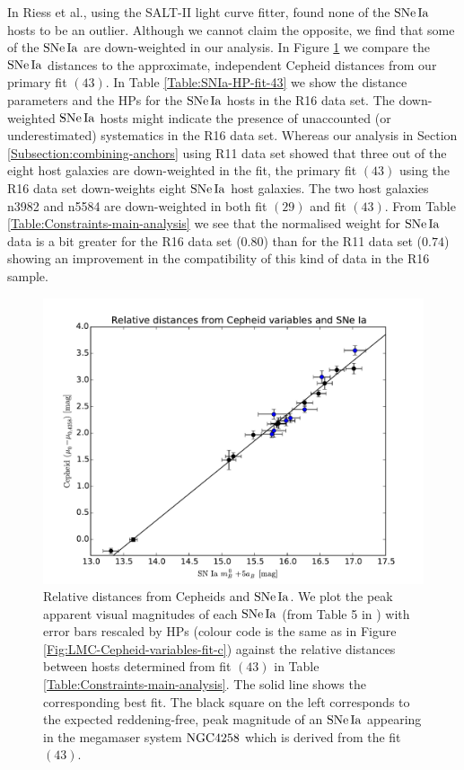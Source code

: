 In \cite{Riess:2016jrr} Riess et al., using the SALT-II light curve fitter, found none of the $\mathrm{SNe\,Ia}$ hosts to be an outlier. Although we cannot claim the opposite, we find that some of the $\mathrm{SNe\,Ia}$ are down-weighted in our analysis. In Figure \ref{Fig:comparison-distances-R16} we compare the $\mathrm{SNe\,Ia}$ distances to the approximate, independent Cepheid distances from our primary fit $(43)$. In Table \ref{Table:SNIa-HP-fit-43} we show the distance parameters and the HPs for the $\mathrm{SNe\,Ia}$ hosts in the R16 data set. The down-weighted $\mathrm{SNe\,Ia}$ hosts might indicate the presence of unaccounted (or underestimated) systematics in the R16 data set. Whereas our analysis in Section \ref{Subsection:combining-anchors} using R11 data set showed that three out of the eight host galaxies are down-weighted in the fit, the primary fit $(43)$ using the R16 data set down-weights eight $\mathrm{SNe\,Ia}$ host galaxies. The two host galaxies n3982 and n5584 are down-weighted in both fit $(29)$ and fit $(43)$. From Table \ref{Table:Constraints-main-analysis} we see that the normalised weight for $\mathrm{SNe\,Ia}$ data is a bit greater for the R16 data set ($0.80$) than for the R11 data set ($0.74$) showing an improvement in the compatibility of this kind of data in the R16 sample.

\begin{figure}[hbtp]
\centering
\includegraphics[width=\textwidth]{figures/chapter-h0/effective_HP_SNIa_R16.pdf}
\caption{Relative distances from Cepheids and $\mathrm{SNe\,Ia}$. We plot the peak apparent visual magnitudes of each $\mathrm{SNe\,Ia}$ (from Table 5 in \cite{Riess:2016jrr}) with error bars rescaled by HPs (colour code is the same as in Figure \ref{Fig:LMC-Cepheid-variables-fit-c}) against the relative distances between hosts determined from fit $(43)$ in Table \ref{Table:Constraints-main-analysis}. The solid line shows the corresponding best fit. The black square on the left corresponds to the expected reddening-free, peak magnitude of an $\mathrm{SNe\,Ia}$ appearing in the megamaser system $\mathrm{NGC4258}$ which is derived from the fit $(43)$.}
\label{Fig:comparison-distances-R16}
\end{figure}

